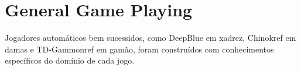 \chapter{General Game Playing}
\label{ggp}

Jogadores automáticos bem sucessidos, como DeepBlue em xadrez, Chinok{ref} em damas e TD-Gammon{ref} em gamão, foram construídos com conhecimentos específicos do domínio de cada jogo. 
